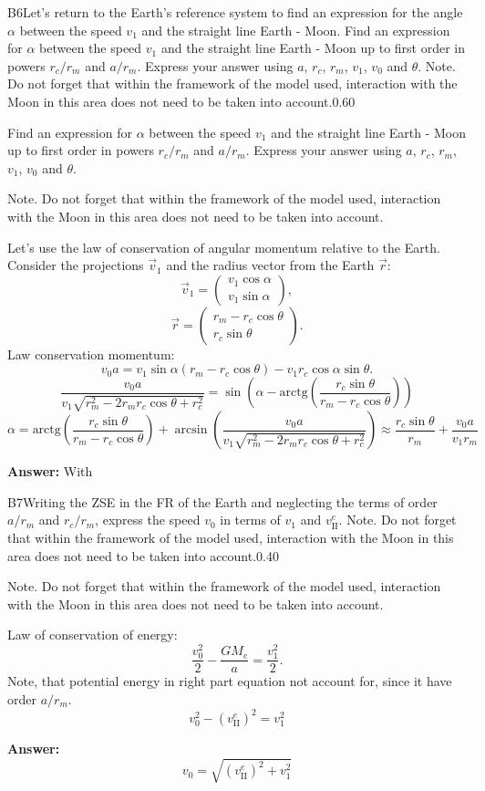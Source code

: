 \documentclass[11pt,a4paper]{article}
\begin{document}
\begin{solcard}{B6}{Let's return to the Earth's reference system to find an expression for the angle $\alpha$ between the speed $v_1$ and the straight line Earth - Moon. Find an expression for $\alpha$ between the speed $v_1$ and the straight line Earth - Moon up to first order in powers $r_c/r_m$ and $a/r_m$. Express your answer using $a$, $r_c$, $r_m$, $v_1$, $v_0$ and $\theta$. Note. Do not forget that within the framework of the model used, interaction with the Moon in this area does not need to be taken into account.}{0.60}

Find an expression for $\alpha$ between the speed $v_1$ and the straight line Earth - Moon up to first order in powers $r_c/r_m$ and $a/r_m$. Express your answer using $a$, $r_c$, $r_m$, $v_1$, $v_0$ and $\theta$.


Note. Do not forget that within the framework of the model used, interaction with the Moon in this area does not need to be taken into account.


Let's use the law of conservation of angular momentum relative to the Earth. Consider the projections $\vec v_1$ and the radius vector from the Earth $\vec r$: $$\vec v_1 = \begin{pmatrix}v_1\cos\alpha\\v_1\sin\alpha\end{pmatrix},$$$$\vec r = \begin{pmatrix}r_m - r_c\cos\theta\\r_c\sin\theta\end{pmatrix}.$$Law conservation momentum: $$v_0 a = v_1\sin\alpha(r_m-r_c\cos\theta) - v_1 r_c\cos\alpha \sin\theta.$$$$\frac{v_0 a}{v_1\sqrt{r _m^2-2r_mr_c\cos\theta +r_c^2}}=\sin\left(\alpha - \text{arctg}\left(\frac{r_c\sin\theta}{r_m-r_c\cos\theta}\right)\right)$$$$\alpha = \text{arctg}\left(\frac{r_c\sin\theta}{r_m-r_c\cos\theta}\right) + \arcsin\left(\frac{v_0 a}{v_1\sqrt{r _m^2-2r_mr_c\cos\theta +r_c^2}}\right)\approx\frac{r_c\sin\theta}{r_m}+\frac{v_0a}{v_1r_m}$$

\par\smallskip\noindent\textbf{Answer:} With
\end{solcard}

\begin{solcard}{B7}{Writing the ZSE in the FR of the Earth and neglecting the terms of order $a/r_m$ and $r_c/r_m$, express the speed $v_0$ in terms of $v_1$ and $v_\text{II}^e$. Note. Do not forget that within the framework of the model used, interaction with the Moon in this area does not need to be taken into account.}{0.40}

Note. Do not forget that within the framework of the model used, interaction with the Moon in this area does not need to be taken into account.


Law of conservation of energy: $$\frac{v_0^2}{2}-\frac{GM_e}{a} = \frac{v_1^2}{2}.$$Note, that potential energy in right part equation not account for, since it have order $a/r_m$. $$v_0^2-\left(v_\text{II}^e\right)^2 = v_1^2$$

\par\smallskip\noindent\textbf{Answer:} $$v_0 = \sqrt{\left(v_\text{II}^e\right)^2+v_1^2}$$
\end{solcard}
\end{document}
